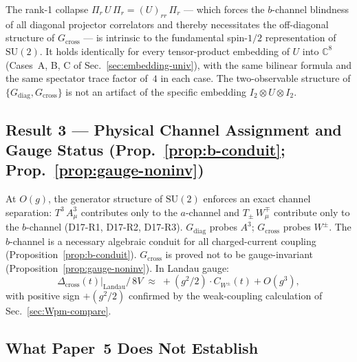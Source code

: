 \documentclass[12pt]{article}
\numberwithin{equation}{section}
\theoremstyle{plain}
\theoremstyle{definition}
\theoremstyle{remark}
\newcommand{\su}{\mathrm{SU}}              %
\newcommand{\Cplx}{\mathbb{C}}             %
\newcommand{\Gdiag}{G_{\mathrm{diag}}}     %
\newcommand{\Gcross}{G_{\mathrm{cross}}}   %
\newcommand{\Dcross}{\Delta_{\mathrm{cross}}}  %
\newcommand{\Pir}{\Pi_{r}}                 %
\begin{document}
	The rank-1 collapse $\Pir\, U\,\Pir = (U)_{rr}\,\Pir$ --- which
	forces the $b$-channel blindness of all diagonal projector
	correlators and thereby necessitates the off-diagonal structure of
	$\Gcross$ --- is intrinsic to the fundamental spin-$1/2$
	representation of $\su(2)$.  It holds identically for every
	tensor-product embedding of $U$ into $\Cplx^{8}$ (Cases~A, B, C of
	Sec.~\ref{sec:embedding-univ}), with the same bilinear formula and
	the same spectator trace factor of~$4$ in each case.  The
	two-observable structure of $\{\Gdiag,\Gcross\}$ is not an artifact
	of the specific embedding $I_{2}\otimes U\otimes I_{2}$.
	
	\subsection*{Result 3 --- Physical Channel Assignment and Gauge
		Status (Prop.~\ref{prop:b-conduit};
		Prop.~\ref{prop:gauge-noninv})}
	\label{sec:result3}
	
	At $O(g)$, the generator structure of $\su(2)$ enforces an exact
	channel separation: $T^{3}\,A^{3}_{\mu}$ contributes only to the
	$a$-channel and $T_{\pm}\,W^{\mp}_{\mu}$ contribute only to the
	$b$-channel (D17-R1, D17-R2, D17-R3).  $\Gdiag$ probes $A^{3}$;
	$\Gcross$ probes $W^{\pm}$.  The $b$-channel is a necessary algebraic
	conduit for all charged-current coupling
	(Proposition~\ref{prop:b-conduit}).  $\Gcross$ is proved not to be
	gauge-invariant (Proposition~\ref{prop:gauge-noninv}).  In Landau
	gauge:
	\[
	\Dcross(t)\big|_{\mathrm{Landau}}\big/\,8V
	\;\approx\; +(g^{2}/2)\cdot C_{W^{\pm}}(t) + O(g^{3}),
	\]
	with positive sign $+(g^{2}/2)$ confirmed by the weak-coupling
	calculation of Sec.~\ref{sec:Wpm-compare}.
	
	\subsection*{What Paper~5 Does Not Establish}
	\label{sec:not-establish}
	
\end{document}
